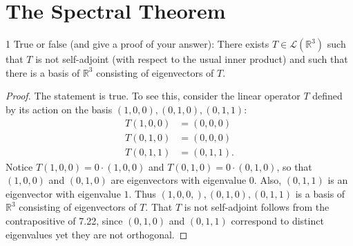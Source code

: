 \documentclass{extarticle}
\newenvironment{problem}[1]{\begin{prob*}{#1}{}}{\end{prob*}}
\newcommand{\R}{\mathbb{R}}
\newcommand{\Hom}{\mathcal{L}}
\begin{document}
\section{The Spectral Theorem}

\begin{problem}{1}
True or false (and give a proof of your answer): There exists $T\in\Hom(\R^3)$ such that $T$ is not self-adjoint (with respect to the usual inner product) and such that there is a basis of $\R^3$ consisting of eigenvectors of $T$.
\end{problem}
\begin{proof}
The statement is true.  To see this, consider the linear operator $T$ defined by its action on the basis $(1, 0, 0), (0, 1, 0), (0, 1, 1)$:
\begin{align*}
T(1, 0, 0) &= (0, 0, 0)\\
T(0, 1, 0) &= (0, 0, 0)\\
T(0, 1, 1) &= (0, 1, 1).
\end{align*}
Notice $T(1, 0, 0) = 0\cdot (1, 0, 0)$ and $T(0, 1, 0) = 0\cdot (0, 1, 0)$, so that $(1, 0, 0)$ and $(0, 1, 0)$ are eigenvectors with eigenvalue $0$.  Also, $(0, 1, 1)$ is an eigenvector with eigenvalue $1$.  Thus $(1, 0, 0,), (0, 1, 0), (0, 1, 1)$ is a basis of $\R^3$ consisting of eigenvectors of $T$.  That $T$ is not self-adjoint follows from the contrapositive of 7.22, since $(0, 1, 0)$ and $(0, 1, 1)$ correspond to distinct eigenvalues yet they are not orthogonal.
\end{proof}
\end{document}
